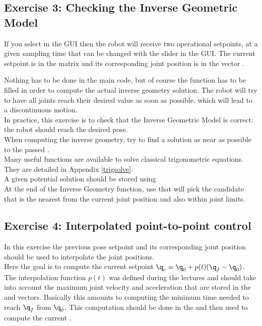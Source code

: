 \documentclass{ecnreport}
\begin{document}
  \newpage
  \subsection*{Exercise 3: Checking the Inverse Geometric Model}
  
  If you select  in the GUI then the robot will receive two operational setpoints, at a given sampling time that can be changed with the  slider in the GUI. The current setpoint is in the matrix  and its corresponding joint position is in the vector .
  
  Nothing has to be done in the main code, but of course the  function has to be filled in order to compute the actual inverse geometry solution. The robot will try to have all joints reach their desired value as soon as possible, which will lead to a discontinuous motion.\\
  
  In practice, this exercise is to check that the Inverse Geometric Model is correct: the robot should reach the desired pose.\\
  
  When computing the inverse geometry, try to find a solution as near as possible to the passed .\\
  
  Many useful functions are available to solve classical trigonometric equations. They are detailed in Appendix \ref{trigsolve}.\\
  
  A given potential solution should be stored using \\ At the end of the Inverse Geometry function, use  that will pick the candidate that is the nearest from the current joint position and also within joint limits.
  
  \subsection*{Exercise 4: Interpolated point-to-point control}
  
  In this exercise the previous pose setpoint  and its corresponding joint position  should be used to interpolate the joint positions.\\
  
  Here the goal is to compute the current setpoint $\q_c = \q_0 + p(t)(\q_f-\q_0)$. The interpolation function $p(t)$ was defined during the lectures and should take into account the maximum joint velocity and acceleration that are stored in the  and  vectors. Basically this amounts to computing the minimum time  needed to reach $\q_f$ from $\q_0$. This computation should be done in the  and then used to compute the current .
  
\end{document}
